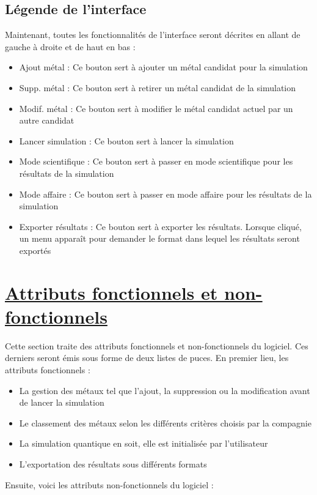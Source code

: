 \documentclass[11pt]{article}
\begin{document}
\subsection{Légende de l'interface}
Maintenant, toutes les fonctionnalités de l'interface seront décrites en allant de gauche à droite et de haut en bas :

\begin{itemize}
  \item Ajout métal : Ce bouton sert à ajouter un métal candidat pour la simulation
  \item Supp. métal : Ce bouton sert à retirer un métal candidat de la simulation
  \item Modif. métal : Ce bouton sert à modifier le métal candidat actuel par un autre candidat
  \item Lancer simulation : Ce bouton sert à lancer la simulation
  \item Mode scientifique : Ce bouton sert à passer en mode scientifique pour les résultats de la simulation
  \item Mode affaire : Ce bouton sert à passer en mode affaire pour les résultats de la simulation
  \item Exporter résultats : Ce bouton sert à exporter les résultats. Lorsque cliqué, un menu apparaît pour demander le format dans lequel les résultats seront exportés
\end{itemize}
\pagebreak


\section{\underline{Attributs fonctionnels et non-fonctionnels}}
Cette section traite des attributs fonctionnels et non-fonctionnels du logiciel. Ces derniers seront émis sous forme de deux listes de puces. En premier lieu, les attributs fonctionnels :

\begin{itemize}
  \item La gestion des métaux tel que l'ajout, la suppression ou la modification avant de lancer la simulation
  \item Le classement des métaux selon les différents critères choisis par la compagnie
  \item La simulation quantique en soit, elle est initialisée par l'utilisateur
  \item L'exportation des résultats sous différents formats
\end{itemize}
Ensuite, voici les attributs non-fonctionnels du logiciel :
\end{document}
